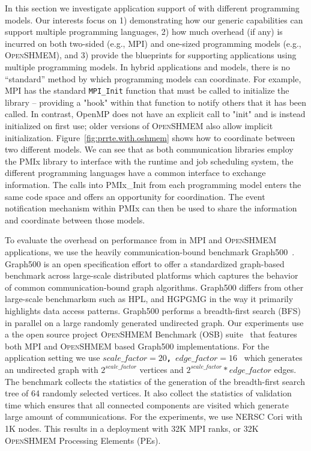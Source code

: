 \documentclass[sigconf]{acmart}
\newcommand{\mpifunc}[1]{\lstinline"MPI_#1"\xspace}
\newcommand{\mpi}[0]{\textsc{MPI}\xspace}
\newcommand{\oshmem}[0]{\textsc{OpenSHMEM}\xspace}
\begin{document}
In this section we investigate application support of \ourwork with different programming models.
Our interests focus on 1) demonstrating how our generic capabilities can support multiple programming languages, 2) how much overhead (if any) is incurred on both two-sided (e.g., \mpi) and one-sized programming models (e.g., \oshmem), and 3) provide the blueprints for supporting applications using multiple programming models.
In hybrid applications and models, there is no ``standard'' method by which programming models can coordinate.
For example, \mpi has the standard \mpifunc{Init} function that must be called to initialize the
library – providing a "hook" within that function to notify others that it has been called.
In contrast, OpenMP does not have an explicit call to "init" and is instead initialized on first use; older versions of \oshmem also allow implicit initialization.
Figure~\ref{fig:prrte.with.oshmem} shows how to coordinate between two different models. We can see
that as both communication libraries employ the PMIx library to interface with the runtime and job scheduling system,
the different programming languages have a common interface to exchange information.
The calls into PMIx\_Init from each programming model enters the same code space and offers an opportunity for coordination.
The event notification mechanism within PMIx can then be used to share the information and coordinate between those models.

To evaluate the overhead on performance from \ourwork
in \mpi and \oshmem applications, we use the heavily communication-bound benchmark Graph500~\cite{graph500}.
Graph500 is an open specification effort to offer a standardized graph-based
benchmark across large-scale distributed
platforms which captures the behavior of common communication-bound graph algorithms.
Graph500 differs from other large-scale
benchmarksm such as HPL, and HGPGMG in the way it primarily highlights data access patterns.
Graph500 performs a breadth-first search (BFS) in
parallel on a large randomly generated undirected graph. Our experiments use a
the open source project \oshmem Benchmark (OSB) suite~\cite{g500shmem} that features both \mpi and \oshmem based
Graph500 implementations. For the application setting we use \texttt{\bf $scale\_factor = 20$, $edge\_factor = 16$ }
which generates an undirected graph with \texttt{\bf $2^{scale\_factor}$} vertices and
\texttt{\bf $2^{scale\_factor}*edge\_factor$} edges. The benchmark collects the statistics
of the generation of the breadth-first search tree of 64 randomly selected vertices. It also
collect the statistics of validation time which ensures that all connected components are visited
which generate large amount of communications. For the experiments, we use NERSC Cori with 1K nodes. This results in a deployment with 32K \mpi  ranks, or 32K \oshmem Processing Elements (PEs).
\end{document}
